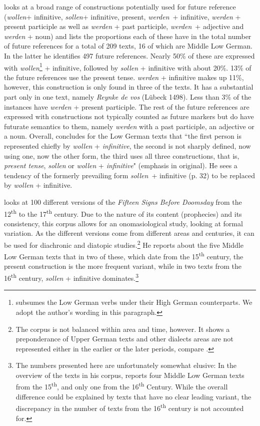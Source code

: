\documentclass[output=paper,colorlinks,citecolor=brown]{langscibook}
\begin{document}
\citet{kurrelmeyer1904} looks at a broad range of constructions potentially used for future reference (\textit{wollen}+ infinitive, \textit{sollen}+ infinitive, present, \textit{werden}~+ infinitive, \textit{werden} + present participle as well as \textit{werden} + past participle, \textit{werden}~+ adjective and \textit{werden} + noun) and lists the proportions each of these have in the total number of future references for a total of 209 texts, 16 of which are Middle Low German. In the latter he identifies 497 future references. Nearly 50\% of these are expressed with \textit{wollen}\footnote{\citet{kurrelmeyer1904} subsumes the Low German verbs under their High German counterparts. We adopt the author's wording in this paragraph.} + infinitive, followed by  \textit{sollen} + infinitive with about 20\%. 13\% of the future references use the present tense. \textit{werden} + infinitive makes up 11\%, however, this construction is only found in three of the texts. It has a substantial part only in one text, namely \textit{Reynke de vos} (Lübeck 1498). Less than 3\% of the instances have \textit{werden} + present participle. The rest of the future references are expressed with constructions not typically counted as future markers but do have futurate semantics to them, namely \textit{werden} with a past participle, an adjective or a noun. Overall, \citet[89]{kurrelmeyer1904} concludes for the Low German texts that ``the first person is represented chiefly by \textit{wollen} + \textit{infinitive}, the second is not sharply defined, now using one, now the other form, the third uses all three constructions, that is, \textit{present tense}, \textit{sollen} or \textit{wollen} + \textit{infinitive}" (emphasis in original). He sees a tendency of the formerly prevailing form \textit{sollen}~+ infinitive (p. 32) to be replaced by \textit{wollen} + infinitive. 

\citet{Schmid2000} looks at 100 different versions of the \textit{Fifteen Signs Before Doomsday} from the 12\textsuperscript{th} to the 17\textsuperscript{th} century. Due to the nature of its content (prophecies) and its consistency, this corpus allows for an onomasiological study, looking at formal variation. As the different versions come from different areas and centuries, it can be used for diachronic and diatopic studies.\footnote{The corpus is not balanced within area and time, however. It shows a preponderance of Upper German texts and other dialects areas are not represented either in the earlier or the later periods, compare \citet[242]{Westvik2000}.} He reports about the five Middle Low German texts that in two of these, which date from the 15\textsuperscript{th} century, the present construction is the more frequent variant, while in two texts from the 16\textsuperscript{th} century, \textit{sollen} + infinitive dominates.\footnote{The numbers presented here are unfortunately somewhat elusive: In the overview of the texts in his corpus, \citeauthor{Schmid2000} reports four Middle Low German texts from the 15\textsuperscript{th}, and only one from the 16\textsuperscript{th} Century. While the overall difference could be explained by texts that have no clear leading variant, the discrepancy in the number of texts from the 16\textsuperscript{th} century is not accounted for.}
\end{document}
